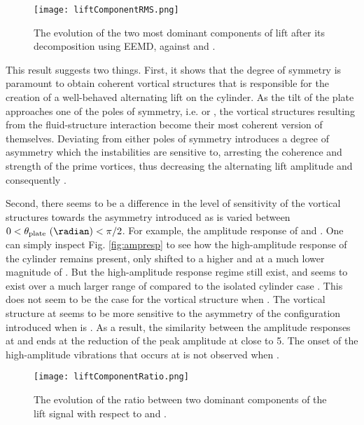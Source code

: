 \documentclass[a4paper]{article}
\begin{document}
\begin{figure}[h]
  \centering
  \texttt{[image: liftComponentRMS.png]}
  \caption{The evolution of the two most dominant components of lift after its decomposition using EEMD, against \ured{} and \ptlt{}.}
  \label{fig:liftcomp}
\end{figure}

This result suggests two things. First, it shows that the degree of symmetry is paramount to obtain coherent vortical structures that is responsible for the creation of a well-behaved alternating lift on the cylinder. As the tilt of the plate approaches one of the poles of symmetry, i.e. \ptlt{} \es{} \rze{} or \rfo{}, the vortical structures resulting from the fluid-structure interaction become their most coherent version of themselves. Deviating from either poles of symmetry introduces a degree of asymmetry which the instabilities are sensitive to, arresting the coherence and strength of the prime vortices, thus decreasing the alternating lift amplitude and consequently \yrms{}.

Second, there seems to be a difference in the level of sensitivity of the vortical structures towards the asymmetry introduced as \ptlt{} is varied between $0 < \theta_{\text{plate}} \text{ (\radian)} < \pi/2$. For example, the amplitude response of \ptlt{} \es{} \rze{} and \ron{}. One can simply inspect Fig. \ref{fig:ampresp} to see how the high-amplitude response of the cylinder remains present, only shifted to a higher \ured{} and at a much lower magnitude of \yrms{}. But the high-amplitude response regime still exist, and seems to exist over a much larger range of \ured{} compared to the isolated cylinder case \parencite{koide2009novel}. This does not seem to be the case for the vortical structure when \ptlt{} \es{} \rfo{}. The vortical structure at \ptlt{} \es{} \rfo{} seems to be more sensitive to the asymmetry of the configuration introduced when \ptlt{} is \rth{}. As a result, the similarity between the amplitude responses at \ptlt{} \es{} \rth{} and \rfo{} ends at the reduction of the peak amplitude at \ured{} close to 5. The onset of the high-amplitude vibrations that occurs at \ured{} \es{} \urei{} is not observed when \ptlt{} \es{} \rth{}.

\begin{figure}[h]
  \centering
  \texttt{[image: liftComponentRatio.png]}
  \caption{The evolution of the ratio between two dominant components of the lift signal with respect to \ured{} and \ptlt{}.}
  \label{fig:liftcomprat}
\end{figure}
\end{document}

